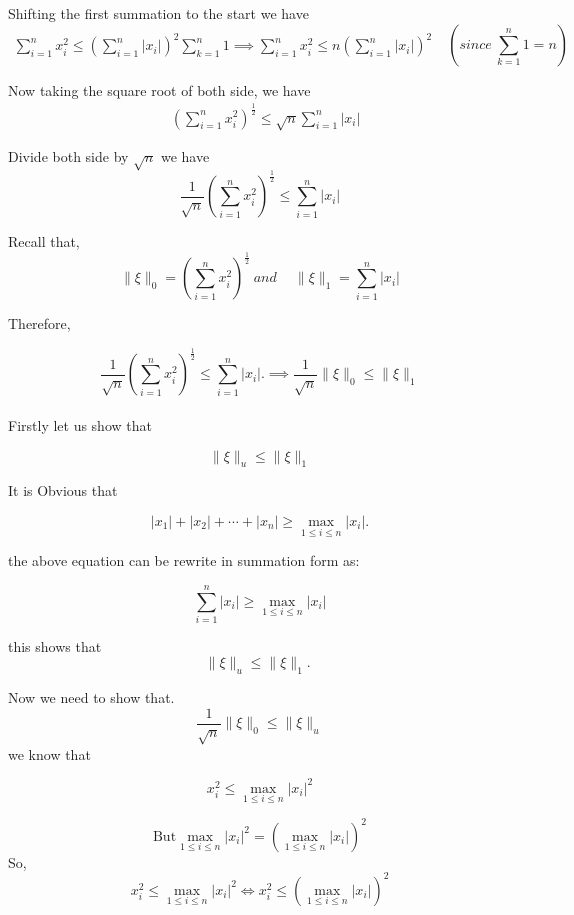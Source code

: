 \documentclass{article}
\begin{document}
Shifting the first summation to the start we have
$$
\begin{gathered}
\sum_{i=1}^{n} x_{i}^{2} \leq\left(\sum_{i=1}^{n}\left|x_{i}\right|\right)^{2} \sum_{k=1}^{n} 1 \implies
\sum_{i=1}^{n} x_{i}^{2} \leq n\left(\sum_{i=1}^{n}\left|x_{i}\right|\right)^{2}  
\end{gathered}~ ~~\left(since ~\sum_{k=1}^{n} 1=n\right)
$$

Now taking the square root of both side, we have
$$
\begin{aligned}
& \left(\sum_{i=1}^{n} x_{i}^{2}\right)^{\frac{1}{2}} \leq \sqrt{n} \sum_{i=1}^{n}\left|x_{i}\right|
\end{aligned}
$$

Divide both side by $\sqrt{n}$ we have
$$ \frac{1}{\sqrt{n}}\left(\sum_{i=1}^{n} x_{i}^{2}\right)^{\frac{1}{2}} \leq \sum_{i=1}^{n}\left|x_{i}\right|
$$

Recall that, $$\|\xi\|_{0}=\left(\sum_{i=1}^{n} x_{i}^{2}\right)^{\frac{1}{2}} ~and ~\quad\|\xi\|_{1}=\sum_{i=1}^{n}\left|x_{i}\right|$$

Therefore,

$$\frac{1}{\sqrt{n}}\left(\sum_{i=1}^{n} x_{i}^{2}\right)^{\frac{1}{2}} \leq \sum_{i=1}^{n}\left|x_{i}\right| .
\implies
\frac{1}{\sqrt{n}}\|\xi\|_{0} \leq\|\xi\|_{1}
$$\\

Firstly let us  show that

$$
\|\xi\|_{u} \leq\|\xi\|_{1}
$$

It is Obvious that

$$
\left|x_{1}\right|+\left|x_{2}\right|+\cdots+\left|x_{n}\right| \geq \max _{1 \leq i \leq n}\left|x_{i}\right| .
$$

the above equation can be rewrite in summation form as:

$$
\sum_{i=1}^{n}\left|x_{i}\right| \geq \max _{1 \leq i \leq n}\left|x_{i}\right|
$$

this shows that
$$
\|\xi\|_{u} \leq\|\xi\|_{1} \text {. }
$$

Now we need to show that.
$$
\frac{1}{\sqrt{n}}\|\xi\|_{0} \leq\|\xi\|_{u}
$$
we know that

$$
x_{i}^{2} \leq \max _{1 \leq i \leq n}\left|x_{i}\right|^{2}
$$

$$ \text{But} \max _{1 \leq i \leq n}\left|x_{i}\right|^{2}=\left(\max _{1 \leq i \leq n}\left|x_{i}\right|\right)^{2}$$
So, $$
x_{i}^{2} \leq \max _{1 \leq i \leq n}\left|x_{i}\right|^{2} \iff x_{i}^{2} \leq\left(\max _{1 \leq i \leq n}\left|x_{i}\right|\right)^{2}
$$
\end{document}
